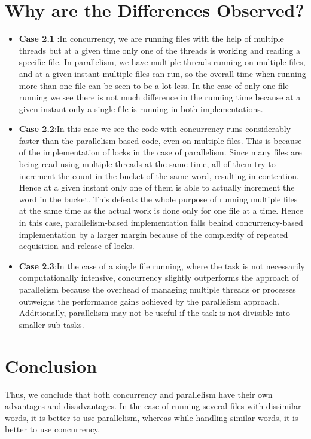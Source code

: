\documentclass[english, 12pt]{article}
\begin{document}
\section{Why are the Differences Observed?}
\begin{itemize}
    \item \textbf{Case 2.1} :In concurrency, we are running files with the help of multiple threads but at a given time only one of the threads is working and reading a specific file. In parallelism, we have multiple threads running on multiple files, and at a given instant multiple files can run, so the overall time when running more than one file can be seen to be a lot less. In the case of only one file running we see there is not much difference in the running time because at a given instant only a single file is running in both implementations.
    \item \textbf{Case 2.2}:In this case we see the code with concurrency runs considerably faster than the parallelism-based code, even on multiple files. This is because of the implementation of locks in the case of parallelism. Since many files are being read using multiple threads at the same time, all of them try to increment the count in the bucket of the same word, resulting in contention. Hence at a given instant only one of them is able to actually increment the word in the bucket. This defeats the whole purpose of running multiple files at the same time as the actual work is done only for one file at a time. Hence in this case, parallelism-based implementation falls behind concurrency-based implementation by a larger margin because of the complexity of repeated acquisition and release of locks.
    \item \textbf{Case 2.3}:In the case of a single file running, where the task is not necessarily computationally intensive, concurrency slightly outperforms the approach of parallelism because the overhead of managing multiple threads or processes outweighs the performance gains achieved by the parallelism approach. Additionally, parallelism may not be useful if the task is not divisible into smaller sub-tasks.
\end{itemize}

\section{Conclusion}
Thus, we conclude that both concurrency and parallelism have their own advantages and disadvantages. In the case of running several files with dissimilar words, it is better to use parallelism, whereas while handling similar words, it is better to use concurrency.
\end{document}
